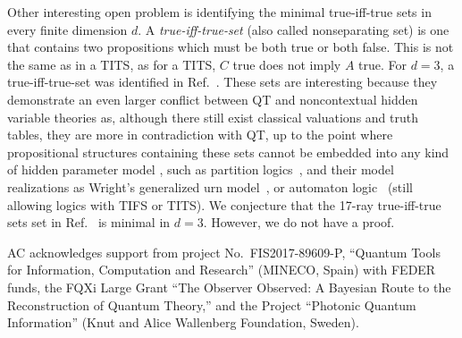 \documentclass[%
 twocolumn,
 groupedaddress,
 showpacs,
 showkeys,
 preprintnumbers,
 amsmath,amssymb,
 aps,
 pra,
 longbibliography,
 floatfix,
 ]{revtex4-1}
\begin{document}
Other interesting open problem is identifying the minimal true-iff-true sets in every finite dimension $d$. A {\em true-iff-true-set} (also called nonseparating set) is one that contains two propositions which must be both true or both false. This is not the same as in a TITS, as for a TITS, $C$ true does not imply $A$ true. For $d=3$, a true-iff-true-set was identified in Ref.\ \cite{KS67}. These sets are interesting because they demonstrate an even larger conflict between QT and noncontextual hidden variable theories as, although there still exist classical valuations and truth tables, they are more in contradiction with QT, up to the point where propositional structures containing these sets cannot be embedded into any kind of hidden parameter model \cite{KS67}, such as partition logics~\cite{svozil-2001-eua}, and their model realizations as Wright's generalized urn model~\cite{wright}, or automaton logic~\cite{schaller-96} (still allowing logics with TIFS or TITS). We conjecture that the 17-ray true-iff-true sets set in Ref.\ \cite{KS67} is minimal in $d=3$. However, we do not have a proof.


\begin{acknowledgments}
 AC acknowledges support from project No.\ FIS2017-89609-P, ``Quantum Tools for Information, Computation and Research'' (MINECO, Spain) with FEDER funds, the FQXi Large Grant ``The Observer Observed: A Bayesian Route to the Reconstruction of Quantum Theory,'' and the Project ``Photonic Quantum Information'' (Knut and Alice Wallenberg Foundation, Sweden).
\end{acknowledgments}

\end{document}
